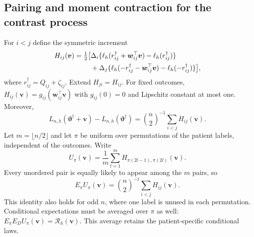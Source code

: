 \subsection{Pairing and moment contraction for the contrast process}
\label{subapp:pair-process}
For $i<j$ define the symmetric increment
\begin{align}
 H_{ij}(\bm{v})=\tfrac12\big[&\Delta_i\{\ell_h(r_{ij}^\dagger+\bm{w}_{ij}^\top \bm{v})-\ell_h(r_{ij}^\dagger)\}\notag\\
 &+\Delta_j\{\ell_h(-r_{ij}^\dagger-\bm{w}_{ij}^\top \bm{v})-\ell_h(-r_{ij}^\dagger)\}\big],
 \label{eq:C-symmetric-kernel}
\end{align}
where $r_{ij}^\dagger=Q_{ij}+\zeta_{ij}$. Extend $H_{ji}=H_{ij}$. For fixed outcomes, $H_{ij}(\bm{v})=g_{ij}(\bm{w}_{ij}^\top \bm{v})$ with $g_{ij}(0)=0$ and Lipschitz constant at most one. Moreover,
\[
 L_{n,h}(\bm{\vartheta}^\dagger+\bm{v})-L_{n,h}(\bm{\vartheta}^\dagger)
  =\binom n2^{-1}\sum_{i<j}H_{ij}(\bm{v}).
\]
Let $m=\lfloor n/2\rfloor$ and let $\pi$ be uniform over permutations of the patient labels, independent of the outcomes. Write
\[
 U_\pi(\bm{v})=\frac1m\sum_{l=1}^m H_{\pi(2l-1),\pi(2l)}(\bm{v}).
\]
Every unordered pair is equally likely to appear among the $m$ pairs, so
\begin{equation}
 E_\pi U_\pi(\bm{v})=\binom n2^{-1}\sum_{i<j}H_{ij}(\bm{v}).
 \label{eq:C-pairing-identity}
\end{equation}
This identity also holds for odd $n$, where one label is unused in each permutation. Conditional expectations must be averaged over $\pi$ as well: $E_\pi E_DU_\pi(\bm{v})=\mathcal R_h(\bm{v})$. This average retains the patient-specific conditional laws.

